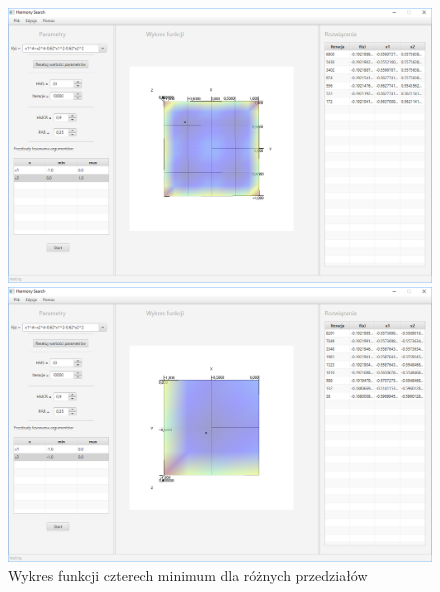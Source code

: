 \documentclass[10pt, a4paper]{article}
\begin{document}
\begin{figure}[htbp]
\begin{minipage}[b]{.5\textwidth}
	\end{minipage}
	\newline \newline
	\begin{minipage}[b]{.5\textwidth}
		\centering
		\includegraphics[width=\linewidth]{images/16.PNG}
		\caption{$x_{1}\in<-1,0>,  x_{2}\in<0,1>$}
	\end{minipage} 
	\begin{minipage}[b]{.5\textwidth}
		\centering
		\includegraphics[width=\linewidth]{images/14.PNG}
		\caption{$x_{1}\in<-1,0>,  x_{2}\in<-1,0>$}
	\end{minipage}
	\label{fig:12}
	\caption{Wykres funkcji czterech minimum dla różnych przedziałów}
\end{figure}
 
\end{document}
